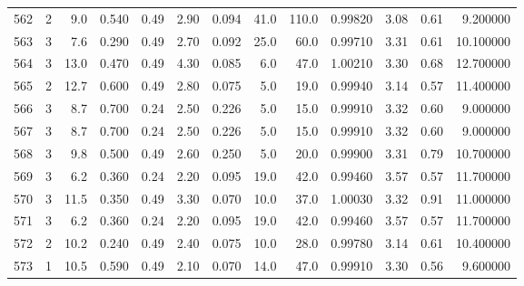\begin{tabular}{lrrrrrrrrrrrr}
562  &        2 &            9.0 &             0.540 &         0.49 &            2.90 &      0.094 &                 41.0 &                 110.0 &  0.99820 &  3.08 &       0.61 &   9.200000 \\
563  &        3 &            7.6 &             0.290 &         0.49 &            2.70 &      0.092 &                 25.0 &                  60.0 &  0.99710 &  3.31 &       0.61 &  10.100000 \\
564  &        3 &           13.0 &             0.470 &         0.49 &            4.30 &      0.085 &                  6.0 &                  47.0 &  1.00210 &  3.30 &       0.68 &  12.700000 \\
565  &        2 &           12.7 &             0.600 &         0.49 &            2.80 &      0.075 &                  5.0 &                  19.0 &  0.99940 &  3.14 &       0.57 &  11.400000 \\
566  &        3 &            8.7 &             0.700 &         0.24 &            2.50 &      0.226 &                  5.0 &                  15.0 &  0.99910 &  3.32 &       0.60 &   9.000000 \\
567  &        3 &            8.7 &             0.700 &         0.24 &            2.50 &      0.226 &                  5.0 &                  15.0 &  0.99910 &  3.32 &       0.60 &   9.000000 \\
568  &        3 &            9.8 &             0.500 &         0.49 &            2.60 &      0.250 &                  5.0 &                  20.0 &  0.99900 &  3.31 &       0.79 &  10.700000 \\
569  &        3 &            6.2 &             0.360 &         0.24 &            2.20 &      0.095 &                 19.0 &                  42.0 &  0.99460 &  3.57 &       0.57 &  11.700000 \\
570  &        3 &           11.5 &             0.350 &         0.49 &            3.30 &      0.070 &                 10.0 &                  37.0 &  1.00030 &  3.32 &       0.91 &  11.000000 \\
571  &        3 &            6.2 &             0.360 &         0.24 &            2.20 &      0.095 &                 19.0 &                  42.0 &  0.99460 &  3.57 &       0.57 &  11.700000 \\
572  &        2 &           10.2 &             0.240 &         0.49 &            2.40 &      0.075 &                 10.0 &                  28.0 &  0.99780 &  3.14 &       0.61 &  10.400000 \\
573  &        1 &           10.5 &             0.590 &         0.49 &            2.10 &      0.070 &                 14.0 &                  47.0 &  0.99910 &  3.30 &       0.56 &   9.600000 \\

\end{tabular}
